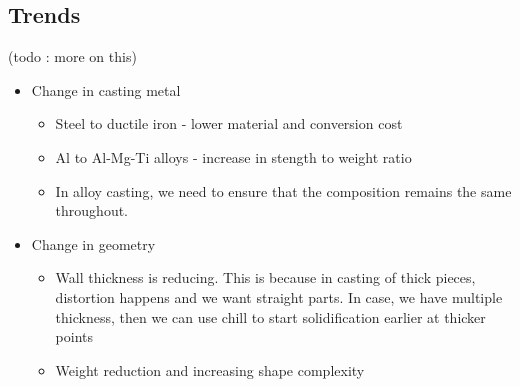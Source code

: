 \documentclass{article}
\begin{document}
\subsection{Trends}
(todo : more on this)
\begin{itemize}
	\item Change in casting metal
	\begin{itemize}
	 	\item Steel to ductile iron - lower material and conversion cost
	 	\item Al to Al-Mg-Ti alloys - increase in stength to weight ratio
	 	\item In alloy casting, we need to ensure that the composition remains the same throughout.
	 \end{itemize}
	\item Change in geometry
	\begin{itemize}
		\item Wall thickness is reducing. This is because in casting of thick pieces, distortion happens and we want straight parts. In case, we have multiple thickness, then we can use chill to start solidification earlier at thicker points
		\item Weight reduction and increasing shape complexity
	\end{itemize}
\end{itemize}
\end{document}
